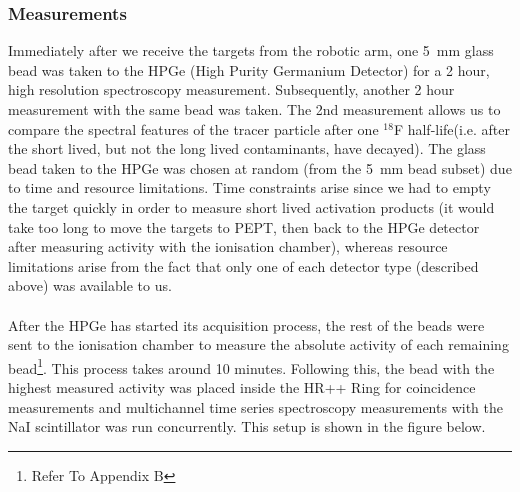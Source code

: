 \documentclass[]{article}
\begin{document}
\subsubsection{Measurements}

Immediately after we receive the targets from the robotic arm, one \SI{5}{\milli \metre} glass bead was taken to the HPGe (High Purity Germanium Detector) for a 2 hour, high resolution spectroscopy measurement. Subsequently, another 2 hour measurement with the same bead was taken. The 2nd measurement allows us to compare the spectral features of the tracer particle after one ${}^{18}$F half-life(i.e. after the short lived, but not the long lived contaminants, have decayed). The glass bead taken to the HPGe was chosen at random (from the \SI{5}{\milli \metre} bead subset) due to time and resource limitations. Time constraints arise since we had to empty the target quickly in order to measure short lived activation products (it would take too long to move the targets to PEPT, then back to the HPGe detector after measuring activity with the ionisation chamber), whereas resource limitations arise from the fact that only one of each detector type (described above) was available to us.\\\\
After the HPGe has started its acquisition process, the rest of the beads were sent to the ionisation chamber to measure the absolute activity of each remaining bead\footnote{Refer To Appendix B}. This process takes around 10 minutes. Following this, the bead with the highest measured activity was placed inside the HR++ Ring for coincidence measurements and multichannel time series spectroscopy measurements with the NaI scintillator was run concurrently. This setup is shown in the figure below.
\end{document}
